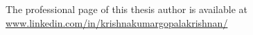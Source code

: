 
\cleardoublepage

\newpage\null\thispagestyle{plain}
\vfill
\parbox{125mm}{
    \doublespacing
    \large
    \noindent The professional page of this thesis author is available at \\
    \url{www.linkedin.com/in/krishnakumargopalakrishnan/}
}
    \blackurl
    \regularurl
\newpage

